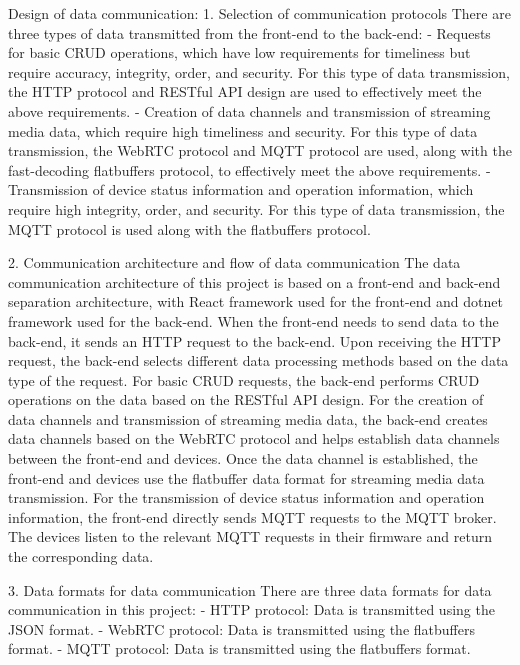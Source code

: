 Design of data communication:
1. Selection of communication protocols
There are three types of data transmitted from the front-end to the back-end: 
- Requests for basic CRUD operations, which have low requirements for timeliness but require accuracy, integrity, order, and security. 
For this type of data transmission, the HTTP protocol and RESTful API design are used to effectively meet the above requirements.
- Creation of data channels and transmission of streaming media data, which require high timeliness and security. 
For this type of data transmission, the WebRTC protocol and MQTT protocol are used, along with the fast-decoding flatbuffers protocol, to effectively meet the above requirements.
- Transmission of device status information and operation information, which require high integrity, order, and security. 
For this type of data transmission, the MQTT protocol is used along with the flatbuffers protocol.

2. Communication architecture and flow of data communication
The data communication architecture of this project is based on a front-end and back-end separation architecture, with React framework used for the front-end and dotnet framework used for the back-end.
When the front-end needs to send data to the back-end, it sends an HTTP request to the back-end. Upon receiving the HTTP request, the back-end selects different data processing methods based on the data type of the request. 
For basic CRUD requests, the back-end performs CRUD operations on the data based on the RESTful API design. 
For the creation of data channels and transmission of streaming media data, the back-end creates data channels based on the WebRTC protocol and helps establish data channels between the front-end and devices. Once the data channel is established, the front-end and devices use the flatbuffer data format for streaming media data transmission.
For the transmission of device status information and operation information, the front-end directly sends MQTT requests to the MQTT broker. The devices listen to the relevant MQTT requests in their firmware and return the corresponding data.

3. Data formats for data communication
There are three data formats for data communication in this project:
- HTTP protocol: Data is transmitted using the JSON format.
- WebRTC protocol: Data is transmitted using the flatbuffers format.
- MQTT protocol: Data is transmitted using the flatbuffers format.

